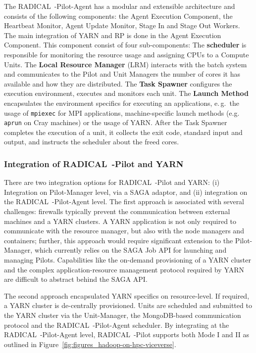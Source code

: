 The RADICAL~-Pilot-Agent has a modular and extensible architecture and consists of the following components: the Agent Execution Component, the Heartbeat Monitor, Agent Update Monitor, Stage In and Stage Out Workers.
The main integration of YARN and RP is done in the Agent Execution Component.
This component consist of four sub-components:
The {\bf scheduler} is responsible for monitoring the resource usage and assigning CPUs to a Compute Units.
The {\bf Local Resource Manager} (LRM) interacts with the batch system and communicates to the Pilot and Unit Managers the number of cores it has available and how they are distributed.
The {\bf Task Spawner} configures the execution environment, executes and monitors each unit.
The {\bf Launch Method} encapsulates the environment specifics for executing an applications, e.\,g.\ the usage of \texttt{mpiexec} for MPI applications, machine-specific launch methods (e.g. \texttt{aprun} on Cray machines) or the usage of YARN.
After the Task Spawner completes the execution of a unit, it collects the exit code, standard input and output, and instructs the scheduler about the freed cores.


\subsubsection{Integration of RADICAL~-Pilot and YARN}
\label{sssec:rp-yarn}

There are two integration options for RADICAL~-Pilot and YARN: (i) Integration on Pilot-Manager level, via a SAGA adaptor, and (ii) integration on the RADICAL~-Pilot-Agent level.
The first approach is associated with several challenges: firewalls typically prevent the communication between external machines and a YARN clusters.
A YARN application is not only required to communicate with the resource manager, but also with the node managers and containers; further, this approach would require significant extension to the Pilot-Manager, which currently relies on the SAGA Job API for launching and managing Pilots.
Capabilities like the on-demand provisioning of a YARN cluster and the complex application-resource management protocol required by YARN are difficult to abstract behind the SAGA API.  

The second approach encapsulated YARN specifics on resource-level.
If required, a YARN cluster is de-centrally provisioned.
Units are scheduled and submitted to the YARN cluster via the Unit-Manager, the MongoDB-based communication protocol and the RADICAL~-Pilot-Agent scheduler.
By integrating at the RADICAL~-Pilot-Agent level, RADICAL~-Pilot supports both Mode I and II as outlined in Figure~\ref{fig:figures_hadoop-on-hpc-viceverse}.

